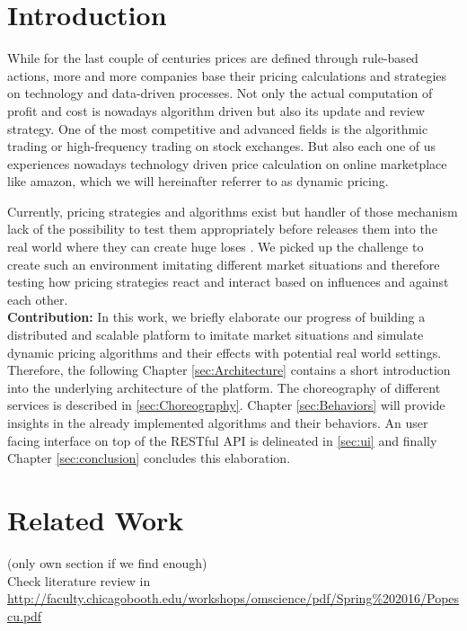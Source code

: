 \section{Introduction}
%
While for the last couple of centuries prices are defined through rule-based actions, more and more companies base their pricing calculations and strategies on technology and data-driven processes. Not only the actual computation of profit and cost is nowadays algorithm driven but also its update and review strategy.
One of the most competitive and advanced fields is the algorithmic trading or high-frequency trading on stock exchanges. But also each one of us experiences nowadays technology driven price calculation on online marketplace like amazon, which we will hereinafter referrer to as dynamic pricing. 

Currently, pricing strategies and algorithms exist but handler of those mechanism lack of the possibility to test them appropriately before releases them into the real world where they can create huge loses \citep{uflacker2016ertragsmanagement} \citep{schlosser2016optimal} \citep{schlosser2016stochastic} \citep{schlosser2016survive}. We picked up the challenge to create such an environment imitating different market situations and therefore testing how pricing strategies react and interact based on influences and against each other.\\

\textbf{Contribution:} In this work, we briefly elaborate our progress of building a distributed and scalable platform to imitate market situations and simulate dynamic pricing algorithms and their effects with potential real world settings.
Therefore, the following Chapter \ref{sec:Architecture} contains a short introduction into the underlying architecture of the platform.
The choreography of different services is described in \ref{sec:Choreography}. Chapter \ref{sec:Behaviors} will provide insights in the already implemented algorithms and their behaviors.
An user facing interface on top of the RESTful API is delineated in \ref{sec:ui} and finally Chapter \ref{sec:conclusion} concludes this elaboration. \\


\section{Related Work}
(only own section if we find enough) \\

Check literature review in \url{http://faculty.chicagobooth.edu/workshops/omscience/pdf/Spring%202016/Popescu.pdf}